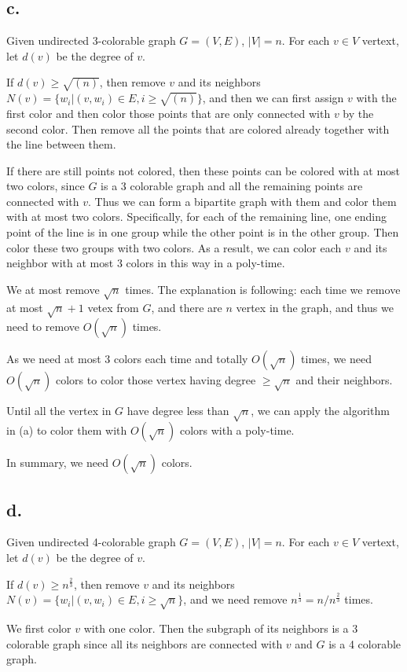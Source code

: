 \documentclass[a4paper,12pt]{article}
\begin{document}
\subsection*{c.}
Given undirected 3-colorable graph $G=(V,E)$,  $|V|=n$.
For each $v \in V$ vertext, let $d(v)$ be the degree of $v$.

If $d(v)\geq \sqrt{(n)}$, then remove $v$ and its neighbors $N(v)=\{w_i| (v,w_i) \in E, i\geq \sqrt{(n)}\}$, and then we can first assign $v$ with the first color and then color those points that are only connected with $v$ by the second color. Then remove all the points that are colored already together with the line between them. 

If there are still points not colored, then these points can be colored with at most two colors, since $G$ is a 3 colorable graph and all the remaining points are connected with $v$.  Thus we can form a bipartite graph with them and color them with at most two colors. Specifically, for each of the remaining line, one ending point of the line is in one group while the other point is in the other group. Then color these two groups with two colors.  As a result, we can color each $v$ and its neighbor with at most 3 colors in this way in a poly-time.
 
We at most remove $\sqrt{n}$ times. The explanation is following: each time we remove at most $\sqrt{n}+1$ vetex from $G$, and there are $n$ vertex in the graph, and thus we need to remove $ O(\sqrt{n}) $ times. 

As we need at most 3 colors each time and totally  $ O(\sqrt{n}) $ times, we need $O(\sqrt{n})$ colors to color those vertex having degree $\geq \sqrt{n}$ and their neighbors. 

Until all the vertex in $G$ have degree less than $\sqrt{n}$, we can apply the algorithm in (a) to color them with $O(\sqrt{n})$ colors with a poly-time.

In summary, we need $O(\sqrt{n}) $ colors.
\subsection*{d.}
Given undirected 4-colorable graph $G=(V,E)$,  $|V|=n$.
For each $v \in V$ vertext, let $d(v)$ be the degree of $v$. 

If $d(v)\geq n^{\frac{2}{3}}$, then remove $v$ and its neighbors $N(v)=\{w_i| (v,w_i) \in E, i\geq \sqrt{n}\}$, and we need remove $n^{\frac{1}{3}}=n/n^{\frac{2}{3}}$ times. 

We first color $v$ with one color. Then the subgraph of its neighbors is a 3 colorable graph since all its neighbors are connected with $v$ and $G$ is a 4 colorable graph.  
\end{document}
